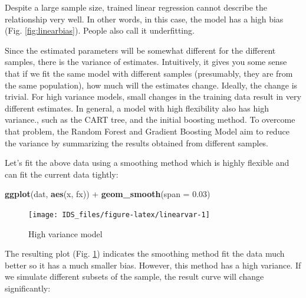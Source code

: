 \documentclass[12pt,]{krantz}
\newenvironment{Shaded}{\begin{snugshade}}{\end{snugshade}}
\newcommand{\KeywordTok}[1]{\textcolor[rgb]{0.13,0.29,0.53}{\textbf{{#1}}}}
\newcommand{\DataTypeTok}[1]{\textcolor[rgb]{0.13,0.29,0.53}{{#1}}}
\newcommand{\FloatTok}[1]{\textcolor[rgb]{0.00,0.00,0.81}{{#1}}}
\newcommand{\StringTok}[1]{\textcolor[rgb]{0.31,0.60,0.02}{{#1}}}
\newcommand{\NormalTok}[1]{{#1}}
\theoremstyle{definition}
\theoremstyle{definition}
\theoremstyle{remark}
\begin{document}
Despite a large sample size, trained linear regression cannot describe
the relationship very well. In other words, in this case, the model has
a high bias (Fig. \ref{fig:linearbias}). People also call it
underfitting.

Since the estimated parameters will be somewhat different for the
different samples, there is the variance of estimates. Intuitively, it
gives you some sense that if we fit the same model with different
samples (presumably, they are from the same population), how much will
the estimates change. Ideally, the change is trivial. For high variance
models, small changes in the training data result in very different
estimates. In general, a model with high flexibility also has high
variance., such as the CART tree, and the initial boosting method. To
overcome that problem, the Random Forest and Gradient Boosting Model aim
to reduce the variance by summarizing the results obtained from
different samples.

Let's fit the above data using a smoothing method which is highly
flexible and can fit the current data tightly:

\begin{Shaded}
\begin{Highlighting}[]
\KeywordTok{ggplot}\NormalTok{(dat, }\KeywordTok{aes}\NormalTok{(x, fx)) +}\StringTok{ }\KeywordTok{geom_smooth}\NormalTok{(}\DataTypeTok{span =} \FloatTok{0.03}\NormalTok{)}
\end{Highlighting}
\end{Shaded}

\begin{figure}

{\centering \texttt{[image: IDS\_files/figure-latex/linearvar-1]} 

}

\caption{High variance model}\label{fig:linearvar}
\end{figure}

The resulting plot (Fig. \ref{fig:linearvar}) indicates the smoothing
method fit the data much better so it has a much smaller bias. However,
this method has a high variance. If we simulate different subsets of the
sample, the result curve will change significantly:
\end{document}
